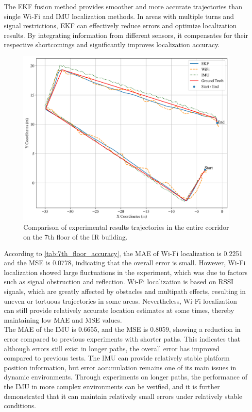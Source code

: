 \documentclass[12pt,a4paper]{article}
\numberwithin{equation}{section}
\begin{document}
The EKF fusion method provides smoother and more accurate trajectories than single Wi-Fi and IMU localization methods. In areas with multiple turns and signal restrictions, EKF can effectively reduce errors and optimize localization results. By integrating information from different sensors, it compensates for their respective shortcomings and significantly improves localization accuracy.
\begin{figure}[H]
    \centering
    \includegraphics[width=0.8\linewidth]{images/1/3.png}
    \caption{Comparison of experimental results trajectories in the entire corridor on the 7th floor of the IR building.}
    \label{fig:ir_full_7}
\end{figure}
\noindent According to \autoref{tab:7th_floor_accuracy}, the MAE of Wi-Fi localization is 0.2251 and the MSE is 0.0778, indicating that the overall error is small. However, Wi-Fi localization showed large fluctuations in the experiment, which was due to factors such as signal obstruction and reflection. Wi-Fi localization is based on RSSI signals, which are greatly affected by obstacles and multipath effects, resulting in uneven or tortuous trajectories in some areas. Nevertheless, Wi-Fi localization can still provide relatively accurate location estimates at some times, thereby maintaining low MAE and MSE values.\\
The MAE of the IMU is 0.6655, and the MSE is 0.8059, showing a reduction in error compared to previous experiments with shorter paths. This indicates that although errors still exist in longer paths, the overall error has improved compared to previous tests. The IMU can provide relatively stable platform position information, but error accumulation remains one of its main issues in dynamic environments. Through experiments on longer paths, the performance of the IMU in more complex environments can be verified, and it is further demonstrated that it can maintain relatively small errors under relatively stable conditions.
\end{document}
